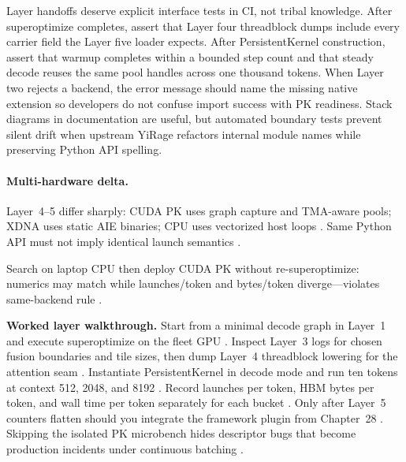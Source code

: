 Layer handoffs deserve explicit interface tests in CI, not tribal knowledge. After superoptimize completes, assert that Layer four threadblock dumps include every carrier field the Layer five loader expects. After PersistentKernel construction, assert that warmup completes within a bounded step count and that steady decode reuses the same pool handles across one thousand tokens. When Layer two rejects a backend, the error message should name the missing native extension so developers do not confuse import success with PK readiness. Stack diagrams in documentation are useful, but automated boundary tests prevent silent drift when upstream YiRage refactors internal module names while preserving Python API spelling.

\paragraph{Multi-hardware delta.} Layer~4--5 differ sharply: CUDA PK uses graph capture and TMA-aware pools; XDNA uses static AIE binaries; CPU uses vectorized host loops \citep{amd2024xdna,amd2024aie,nvidia2022hopper,semianalysis2024tma,yirage2026,chen2020compilerbasedhardw,patel2025llminference,dlbook}. Same Python API must not imply identical launch semantics \citep{yirage2026,chen2020compilerbasedhardw,amd2024aie,amd2024xdna,patel2025llminference,taxbreak2026,memoryfloor2026,kwon2023vllm,dlbook}.

\begin{example}
Search on laptop CPU then deploy CUDA PK without re-superoptimize: numerics may match while launches/token and bytes/token diverge---violates same-backend rule \citep{yirage2026,chen2020compilerbasedhardw,patel2025llminference,taxbreak2026,memoryfloor2026,amd2024xdna,amd2024aie,dlbook}.
\end{example}

\textbf{Worked layer walkthrough.} Start from a minimal decode graph in Layer~1 and execute superoptimize on the fleet GPU \citep{yirage2026,chen2020compilerbasedhardw,patel2025llminference,dlbook}. Inspect Layer~3 logs for chosen fusion boundaries and tile sizes, then dump Layer~4 threadblock lowering for the attention seam \citep{yirage2026,chen2020compilerbasedhardw,dao2022flashattention,semianalysis2024tma,patel2025llminference,dlbook}. Instantiate PersistentKernel in decode mode and run ten tokens at context 512, 2048, and 8192 \citep{yirage2026,patel2025llminference,memoryfloor2026,taxbreak2026,kwon2023vllm,dlbook}. Record launches per token, HBM bytes per token, and wall time per token separately for each bucket \citep{taxbreak2026,memoryfloor2026,patel2025llminference,yirage2026,chen2020compilerbasedhardw,kwon2023vllm,dlbook}. Only after Layer~5 counters flatten should you integrate the framework plugin from Chapter~28 \citep{kwon2023vllm,yirage2026,chen2020compilerbasedhardw,patel2025llminference,dlbook}. Skipping the isolated PK microbench hides descriptor bugs that become production incidents under continuous batching \citep{kwon2023vllm,patel2025llminference,yirage2026,chen2020compilerbasedhardw,memoryfloor2026,taxbreak2026,dlbook}.

